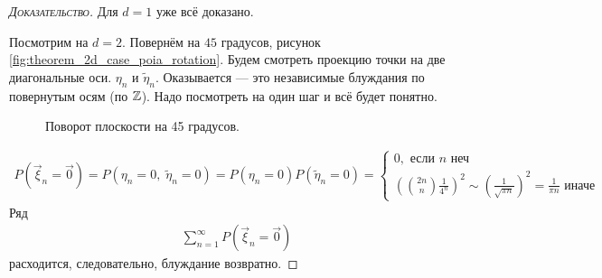 \documentclass[../main.tex]{subfiles}
\begin{document}
\begin{proof}[\normalfont\textsc{Доказательство}]
 Для $ d=1 $ уже всё доказано.

 Посмотрим на $ d=2 $. Повернём на $ 45 $ градусов, рисунок \eqref{fig:theorem_2d_case_poia_rotation}. Будем смотреть проекцию точки на две диагональные оси. $ \eta_n $ и $ \tilde \eta_n $. Оказывается --- это независимые блуждания по повернутым осям (по $ \mathbb{Z} $). Надо посмотреть на один шаг и всё будет понятно.

\begin{figure}[ht]
    \centering
    \caption{Поворот плоскости на 45 градусов.}
    \label{fig:theorem_2d_case_poia_rotation}
\end{figure}

 \begin{align*}
  P(\vec\xi_n = \vec0) = P(\eta_n=0,\;\tilde\eta_n=0)=P(\eta_n=0)P(\tilde\eta_n=0) = \begin{cases}
   0, \text{ если } n \text{ неч}  \\
   (\binom{2n}n \frac{1}{4^{n}})^{2} \sim \left( \frac{1}{\sqrt{\pi n}} \right)^{2} = \frac{1}{\pi n} \text{ иначе }
  \end{cases} 
 \end{align*}
 Ряд
 \begin{align*}
  \sum_{n=1}^{\infty}P(\vec\xi_n=\vec 0)
 \end{align*} расходится, следовательно, блуждание возвратно.


\end{proof}
\end{document}
